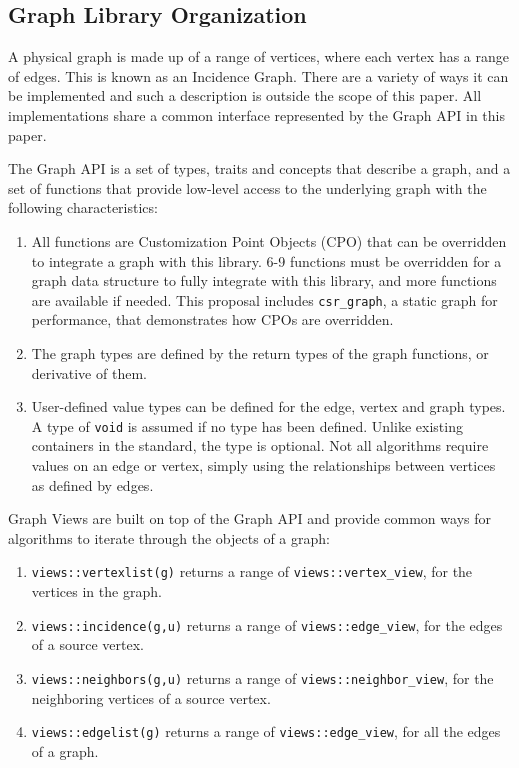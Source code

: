 \documentclass[10pt,onecolumn]{article}
\newcommand{\tcode}[1]{\lstinline[breaklines=true]{#1}}
\begin{document}
\subsection{Graph Library Organization}
A physical graph is made up of a range of vertices, where each vertex has a range of edges. This is known as an Incidence Graph. There are a variety of 
ways it can be implemented and such a description is outside the scope of this paper. All implementations share a common interface represented by the
Graph API in this paper.

The Graph API is a set of types, traits and concepts that describe a graph, and a set of functions that provide low-level access to the 
underlying graph with the following characteristics:
\begin{enumerate}
\item All functions are Customization Point Objects (CPO) that can be overridden to integrate a graph with this library. 
6-9 functions must be overridden for a graph data structure to fully integrate with this library, and more functions are available if needed. This proposal includes 
\tcode{csr_graph}, a static graph for performance, that demonstrates how CPOs are overridden.
\item The graph types are defined by the return types of the graph functions, or derivative of them.
\item User-defined value types can be defined for the edge, vertex and graph types. A type of \tcode{void} is assumed if no type has been defined.
Unlike existing containers in the standard, the type is optional. Not all algorithms require values on an edge or vertex, simply using the relationships
between vertices as defined by edges.
\end{enumerate}

Graph Views are built on top of the Graph API and provide common ways for algorithms to iterate through the objects of a graph:
\begin{enumerate}
\item \tcode{views::vertexlist(g)} returns a range of \tcode{views::vertex_view}, for the vertices in the graph. 
\item \tcode{views::incidence(g,u)} returns a range of \tcode{views::edge_view}, for the edges of a source vertex.
\item \tcode{views::neighbors(g,u)} returns a range of \tcode{views::neighbor_view}, for the neighboring vertices of a source vertex.
\item \tcode{views::edgelist(g)} returns a range of \tcode{views::edge_view}, for all the edges of a graph. 
\end{enumerate}
\end{document}
